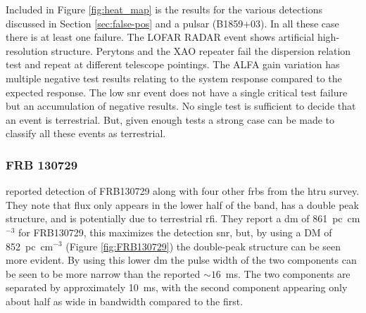 \documentclass[a4paper,fleqn,usenatbib]{mnras}
\begin{document}
Included in Figure \ref{fig:heat_map} is the results for the various detections
discussed in Section \ref{sec:false-pos} and a pulsar (B1859+03). In all these
case there is at least one failure.  The LOFAR RADAR event shows artificial
high-resolution structure.  Perytons and the XAO repeater fail the dispersion
relation test and repeat at different telescope pointings. The ALFA gain
variation has multiple negative test results relating to the system response
compared to the expected response.  The low \gls{snr} event does not have a
single critical test failure but an accumulation of negative results.  No single
test is sufficient to decide that an event is terrestrial. But, given enough
tests a strong case can be made to classify all these events as terrestrial.










\subsubsection{FRB 130729}

\cite{2016MNRAS.460L..30C} reported detection of FRB130729 along with four other
\glspl{frb} from the \gls{htru} survey. They note that flux only appears in the lower
half of the band, has a double peak structure, and is potentially due to
terrestrial \gls{rfi}.  They report a \gls{dm} of 861~pc~cm$^{-3}$ for
FRB130729, this maximizes the detection \gls{snr}, but, by using a DM of
852~pc~cm$^{-3}$ (Figure \ref{fig:FRB130729}) the double-peak structure can be
seen more evident. By using this lower \gls{dm} the pulse width of the two
components can be seen to be more narrow than the reported $\sim 16$~ms.
The two components are separated by approximately 10~ms, with the second
component appearing only about half as wide in bandwidth compared to the first. 
\end{document}
